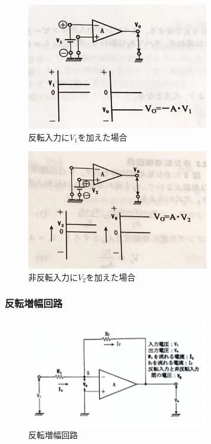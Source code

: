 \documentclass[a4paper,11pt,uplatex]{jsarticle}
\begin{document}
\begin{figure}[H]
	\begin{center}
		\includegraphics[width=8cm]{画像/addV1.jpg}
		\caption{反転入力に$V_1$を加えた場合}
		\label{addV1}
	\end{center}

\end{figure}
\begin{figure}[H]
	\begin{center}
		\includegraphics[width=8cm]{画像/addV2.jpg}
		\caption{非反転入力に$V_2$を加えた場合}
		\label{addV2}
	\end{center}
\end{figure}

\subsubsection{反転増幅回路}
\begin{figure}[H]
	\begin{center}
		\includegraphics[width=8cm]{画像/反転増幅回路.png}
		\caption{反転増幅回路}
		\label{反転増幅回路}
	\end{center}
\end{figure}
\end{document}
